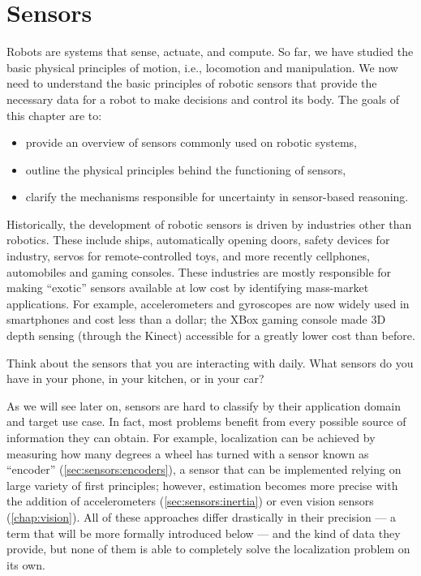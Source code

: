 \chapter{Sensors}\label{chap:sensors}

Robots are systems that sense, actuate, and compute. So far, we have studied the basic physical principles of motion, i.e., locomotion and manipulation. We now need to understand the basic principles of robotic sensors that provide the necessary data for a robot to make decisions and control its body.
%
The goals of this chapter are to:
\begin{itemize}
\item provide an overview of sensors commonly used on robotic systems,
\item outline the physical principles behind the functioning of sensors,
\item clarify the mechanisms responsible for uncertainty in sensor-based reasoning.
\end{itemize}

Historically, the development of robotic sensors is driven by industries other than robotics. These include ships, automatically opening doors, safety devices for industry, servos for remote-controlled toys, and more recently cellphones, automobiles and gaming consoles. These industries are mostly responsible for making ``exotic'' sensors available at low cost by identifying mass-market applications.
For example, accelerometers and gyroscopes are now widely used in smartphones and cost less than a dollar; the XBox gaming console made 3D depth sensing (through the Kinect) accessible for a greatly lower cost than before.

\begin{mdframed}
Think about the sensors that you are interacting with daily. What sensors do you have in your phone, in your kitchen, or in your car?
\end{mdframed}

As we will see later on, sensors are hard to classify by their application domain and target use case. In fact, most problems benefit from every possible source of information they can obtain. For example, localization can be achieved by measuring how many degrees a wheel has turned with a sensor known as ``encoder'' (\ref{sec:sensors:encoders}), a sensor that can be implemented relying on large variety of first principles; however, estimation becomes more precise with the addition of accelerometers (\cref{sec:sensors:inertia}) or even vision sensors (\cref{chap:vision}). All of these approaches differ drastically in their precision --- a term that will be more formally introduced below --- and the kind of data they provide, but none of them is able to completely solve the localization problem on its own.



